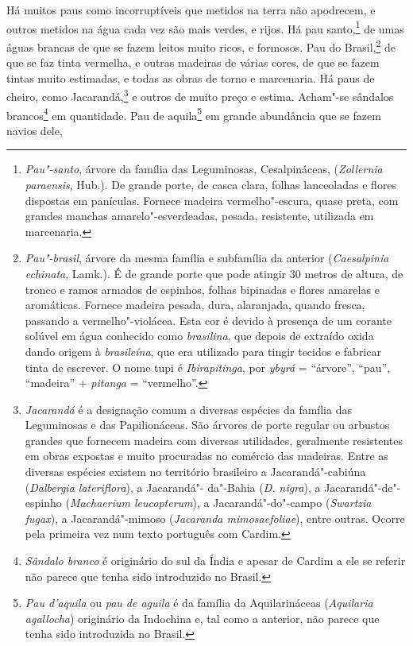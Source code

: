 \begin{linenumbers}
 Há muitos paus como incorruptíveis que metidos na terra não apodrecem,
e outros metidos na água cada vez são mais verdes, e rijos. Há pau
santo,\footnote{ \textit{Pau"-santo}, árvore da família das
Leguminosas, Cesalpináceas, (\textit{Zollernia paraensis}, Hub.). De
grande porte, de casca clara, folhas lanceoladas e flores dispostas em
panículas. Fornece madeira vermelho"-escura, quase preta, com grandes
manchas amarelo"-esverdeadas, pesada, resistente, utilizada em
marcenaria.} de umas águas brancas de que se fazem leitos muito ricos,
e formosos. Pau do Brasil,\footnote{ \textit{Pau"-brasil}, árvore da
mesma família e subfamília da anterior (\textit{Caesalpinia echinata}, 
Lamk.). É de grande porte que pode atingir 30 metros de altura, de
tronco e ramos armados de espinhos, folhas bipinadas e flores amarelas
e aromáticas. Fornece madeira pesada, dura, alaranjada, quando fresca,
passando a vermelho"-violácea. Esta cor é devido à presença de um
corante solúvel em água conhecido como \textit{brasilina}, que depois
de extraído oxida dando origem à \textit{brasileína}, que era utilizado
para tingir tecidos e fabricar tinta de escrever. O nome tupi é
\textit{Ibirapitinga}, por \textit{ybyrá} = ``árvore'', ``pau'', ``madeira''
+ \textit{pitanga} = ``vermelho''.} de que se faz tinta vermelha, e
outras madeiras de várias cores, de que se fazem tintas muito
estimadas, e todas as obras de torno e marcenaria. Há paus de cheiro,
como Jacarandá,\footnote{ \textit{Jacarandá} é a designação comum a
diversas espécies da família das Leguminosas e das Papilionáceas. São
árvores de porte regular ou arbustos grandes que fornecem madeira com
diversas utilidades, geralmente resistentes em obras expostas e muito
procuradas no comércio das madeiras. Entre as diversas espécies existem
no território brasileiro a Jacarandá"-cabiúna (\textit{Dalbergia
lateriflora}), a Jacarandá"- da"-Bahia (\textit{D. nigra}), a
Jacarandá"-de"-espinho (\textit{Machaerium leucopterum}), a
Jacarandá"-do"-campo (\textit{Swartzia fugax}), a Jacarandá"-mimoso
(\textit{Jacaranda mimosaefoliae}), entre outras. Ocorre pela primeira
vez num texto português com Cardim.} e outros de muito preço e estima.
Acham"-se sândalos brancos\footnote{ \textit{Sândalo branco} é
originário do sul da Índia e apesar de Cardim a ele se referir não
parece que tenha sido introduzido no Brasil.} em quantidade. Pau de
aquila\footnote{ \textit{Pau d'aquila} ou \textit{pau de aguila} é
da família da Aquilarináceas (\textit{Aquilaria agallocha}) originário
da Indochina e, tal como a anterior, não parece que tenha sido
introduzida no Brasil.} em grande abundância que se fazem navios dele,

\end{linenumbers}
